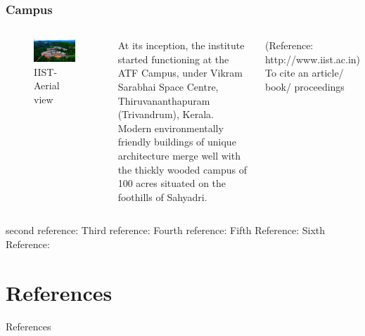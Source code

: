 \documentclass[hyperref={bookmarks=false},aspectratio=169]{beamer}
\begin{document}
\begin{frame}
\frametitle{Campus}

\begin{columns}


\begin{figure}
    \centering
    \includegraphics[width=\columnwidth]{./figures/iist}
    \caption{IIST- Aerial view}
    \label{fig:hollywood_prank}
\end{figure}


At its inception, the institute started functioning at the ATF Campus, under Vikram Sarabhai Space Centre, Thiruvananthapuram (Trivandrum), Kerala. Modern environmentally friendly buildings of unique architecture merge well with the thickly wooded campus of 100 acres situated on the foothills of Sahyadri.

\small{(Reference: http://www.iist.ac.in)}\\
To cite an article/ book/ proceedings


\end{columns}
\cite{santhosh2021generalized} second reference: \cite{ROMANO201714} Third reference:\cite{ROMANO2017151} Fourth reference: \cite{Strogatz1991} Fifth Reference: \cite{strogatz2004sync} Sixth Reference:\cite{thomson1996theory}
\end{frame}

\section{References}
\begin{frame}[allowframebreaks]{References}

	
	
	
\end{frame}
\end{document}

